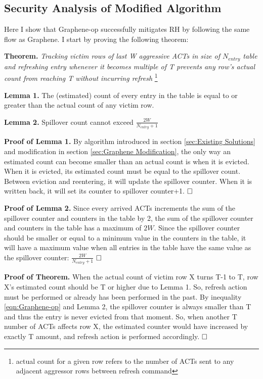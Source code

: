 \subsection{Security Analysis of Modified Algorithm}
Here I show that Graphene-op successfully mitigates RH by following the same flow as Graphene. 
I start by proving the following theorem:

\noindent\textbf{Theorem.} \textit{Tracking victim rows of last W aggressive ACTs in size of $N_{entry}$ table and refreshing entry whenever 
it becomes multiple of T prevents any row's actual count from reaching T without incurring refresh} 
\footnote{actual count for a given row refers to the number of ACTs sent to any adjacent aggressor rows between refresh command}  

\noindent\textbf{Lemma 1.} The (estimated) count of every entry in the table is equal to or greater than the actual count of any victim row.

\noindent\textbf{Lemma 2.} Spillover count cannot exceed $\frac{2W}{N_{entry}+1}$

\noindent\textbf{Proof of Lemma 1.}
By algorithm introduced in section \ref{sec:Existing Solutions} and modification in section \ref{sec:Graphene Modification}, the only way
an estimated count can become smaller than an actual count is when it is evicted. When it is evicted, its estimated count 
must be equal to the spillover count. Between eviction and reentering, it will update the spillover counter. 
When it is written back, it will set its counter to spillover counter+1. $\hfill \square$

\noindent\textbf{Proof of Lemma 2.}
Since every arrived ACTs increments the sum of the spillover counter and counters in the table by 2, 
the sum of the spillover counter and counters in the table has a maximum of $2W$. Since the spillover counter should be smaller or equal
to a minimum value in the counters in the table, it will have a maximum value when all entries in the table have the same value as 
the spillover counter: $\frac{2W}{N_{entry}+1}$ $\hfill \square$

\noindent\textbf{Proof of Theorem.} 
When the actual count of victim row X turns T-1 to T, row X's estimated count should be T or higher due to Lemma 1. So, refresh action 
must be performed or already has been performed in the past. By inequality \ref{eqn:Graphene-op} and Lemma 2,
the spillover counter is always smaller than T and thus the entry is never evicted from that moment. 
So, when another T number of ACTs affects row X, the estimated counter would have increased by exactly T amount, 
and refresh action is performed accordingly. $\hfill \square$

